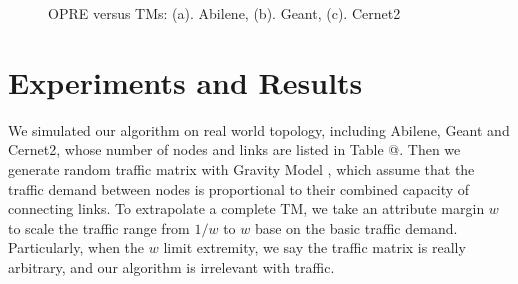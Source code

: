 \documentclass[conference]{IEEEtran}
\makeatletter
\newcommand{\Rmnum}[1]{\expandafter\@slowromancap\romannumeral #1@}
\makeatother
\begin{document}
\begin{figure}[!t]
\centering
\vspace*{0.1in}
\caption{OPRE versus TMs: (a). Abilene, (b). Geant, (c). Cernet2}
\vspace*{0.1in}
\end{figure}


\section{Experiments and Results}
We simulated our algorithm on real world topology, including Abilene, Geant and Cernet2, whose number of nodes and links are listed in Table \Rmnum{1}.
Then we generate random traffic matrix with Gravity Model \cite{networking:gravity}, which assume that the traffic demand between nodes is proportional
to their combined capacity of connecting links. To extrapolate a complete TM, we take an attribute margin $w$ to scale the traffic range from $1/w$ to $w$
base on the basic traffic demand. Particularly, when the $w$ limit extremity, we say the traffic matrix is really arbitrary, and our
algorithm is irrelevant with traffic.
\end{document}
